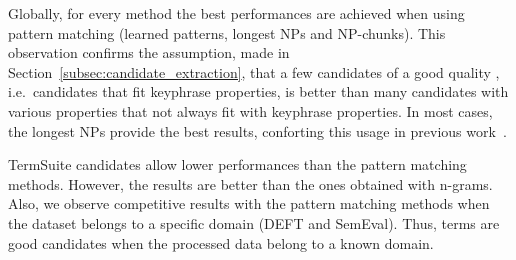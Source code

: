       Globally, for every method the best performances are achieved when using
      pattern matching (learned patterns, longest NPs and NP-chunks). This
      observation confirms the assumption, made in
      Section~\ref{subsec:candidate_extraction}, that a few candidates of a good
      quality , i.e.~candidates that fit keyphrase properties, is better than
      many candidates with various properties that not always fit with keyphrase
      properties. In most cases, the longest NPs provide the best results,
      conforting this usage in previous
      work~\cite{wan2008expandrank,hassan2010conundrums,bougouin2013topicrank}.

      TermSuite candidates allow lower performances than the pattern matching
      methods. However, the results are better than the ones obtained with
      n-grams. Also, we observe competitive results with the pattern matching
      methods when the dataset belongs to a specific domain (DEFT and SemEval).
      Thus, terms are good candidates when the processed data belong to a known
      domain.

